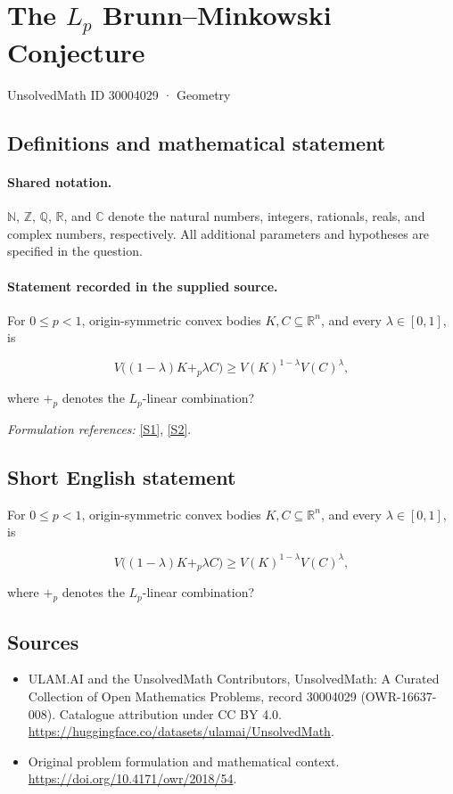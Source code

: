 \documentclass[11pt]{article}
\newcommand{\sref}[2]{\hyperlink{source:#1:#2}{[S#2]}}
\begin{document}
\setcounter{section}{30004028}
\section{\texorpdfstring{The $L_p$ Brunn–Minkowski Conjecture}{The L\_p Brunn–Minkowski Conjecture}}\label{30004029}
{\small UnsolvedMath ID 30004029 · Geometry}
\subsection{Definitions and mathematical statement}

\paragraph{Shared notation.}$\mathbb N$, $\mathbb Z$, $\mathbb Q$, $\mathbb R$, and $\mathbb C$ denote the natural numbers, integers, rationals, reals, and complex numbers, respectively. All additional parameters and hypotheses are specified in the question.


\paragraph{Statement recorded in the supplied source.}
For $0\leq p<1$, origin-symmetric convex bodies $K,C\subseteq\mathbb R^n$, and every $\lambda\in[0,1]$, is

$$V\bigl((1-\lambda)K+_p\lambda C\bigr)\geq V(K)^{1-\lambda}V(C)^\lambda,$$

where $+_p$ denotes the $L_p$-linear combination?
\par\smallskip\textit{Formulation references:} \sref{30004029}{1}, \sref{30004029}{2}.
\subsection{Short English statement}
For $0\leq p<1$, origin-symmetric convex bodies $K,C\subseteq\mathbb R^n$, and every $\lambda\in[0,1]$, is

$$V\bigl((1-\lambda)K+_p\lambda C\bigr)\geq V(K)^{1-\lambda}V(C)^\lambda,$$

where $+_p$ denotes the $L_p$-linear combination?
\subsection{Sources}
\begin{itemize}
\item[\hypertarget{source:30004029:1}{S1}] ULAM.AI and the UnsolvedMath Contributors, UnsolvedMath: A Curated Collection of Open Mathematics Problems, record 30004029 (OWR-16637-008). Catalogue attribution under CC BY 4.0.
\url{https://huggingface.co/datasets/ulamai/UnsolvedMath}.
\item[\hypertarget{source:30004029:2}{S2}] Original problem formulation and mathematical context.
\url{https://doi.org/10.4171/owr/2018/54}.
\end{itemize}
\label{end:30004029}
\end{document}
